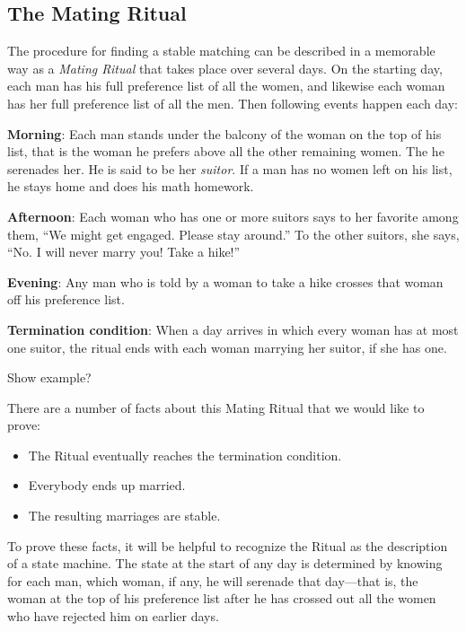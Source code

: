 \subsection{The Mating Ritual}\label{mating_ritual_sec}

The procedure for finding a stable matching can be described in a
memorable way as a \emph{Mating Ritual} that takes place over several
days.  On the starting day, each man has his full preference list of
all the women, and likewise each woman has her full preference list of
all the men.  Then following events happen each day:

\textbf{Morning}: Each man stands under the balcony of the woman on
the top of his list, that is the woman he prefers above all the other
remaining women.  The he serenades her.  He is said to be her
\emph{suitor}.  If a man has no women left on his list, he stays home
and does his math homework.

\textbf{Afternoon}: Each woman who has one or more suitors says to her
favorite among them, ``We might get engaged.  Please stay around.''
To the other suitors, she says, ``No.  I will never marry you!  Take a
hike!''

\textbf{Evening}: Any man who is told by a woman to take a hike
crosses that woman off his preference list.

\textbf{Termination condition}: When a day arrives in which every
woman has at most one suitor, the ritual ends with each woman marrying
her suitor, if she has one.

\begin{editingnotes}
Show example?
\end{editingnotes}

There are a number of facts about this Mating Ritual that we would like to
prove:

\begin{itemize}
\item The Ritual eventually reaches the termination condition.
\item Everybody ends up married.
\item The resulting marriages are stable.
\end{itemize}

To prove these facts, it will be helpful to recognize the Ritual as
the description of a state machine.  The state at the start of any day
is determined by knowing for each man, which woman, if any, he will
serenade that day---that is, the woman at the top of his preference
list after he has crossed out all the women who have rejected him on
earlier days.

